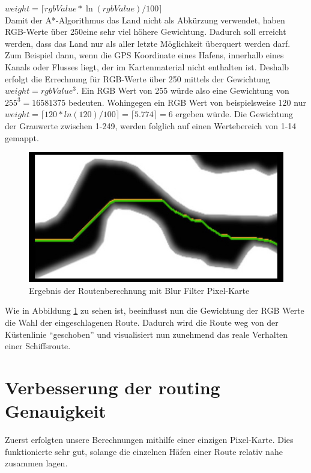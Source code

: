 \documentclass[letterpaper]{article}
\begin{document}
			$weight = \lceil rgbValue * \ln{(rgbValue)/100} \rceil$\\

			Damit der A*-Algorithmus das Land nicht als Abkürzung verwendet, haben RGB-Werte über 250\footnotemark eine sehr viel höhere Gewichtung. Dadurch soll erreicht werden, dass das Land nur als aller letzte Möglichkeit überquert werden darf. Zum Beispiel dann, wenn die GPS Koordinate eines Hafens, innerhalb eines Kanals oder Flusses liegt, der im Kartenmaterial nicht enthalten ist. Deshalb erfolgt die Errechnung für RGB-Werte über 250 mittels der Gewichtung $weight = rgbValue^3$. Ein RGB Wert von 255 würde also eine Gewichtung von $255^3 = 16581375$ bedeuten. Wohingegen ein RGB Wert von beispielsweise 120 nur $ weight = \lceil 120 * ln(120)/100 \rceil = \lceil 5.774 \rceil = 6 $ ergeben würde. Die Gewichtung der Grauwerte zwischen 1-249, werden folglich auf einen Wertebereich von 1-14 gemappt.\\


			\begin{figure}[!htbp]
				\centering
				\includegraphics[width=0.7\linewidth]{route_after_blur}
				\caption{Ergebnis der Routenberechnung mit Blur Filter Pixel-Karte}
				\label{fig:route_after_blur}
			\end{figure}

			Wie in Abbildung \ref{fig:route_after_blur} zu sehen ist, beeinflusst nun die Gewichtung der RGB Werte die Wahl der eingeschlagenen Route. Dadurch wird die Route weg von der Küstenlinie "`geschoben"' und visualisiert nun zunehmend das reale Verhalten einer Schiffsroute.

\section{Verbesserung der routing Genauigkeit}
	Zuerst erfolgten unsere Berechnungen mithilfe einer einzigen Pixel-Karte. Dies funktionierte sehr gut, solange die einzelnen Häfen einer Route relativ nahe zusammen lagen.
\end{document}
